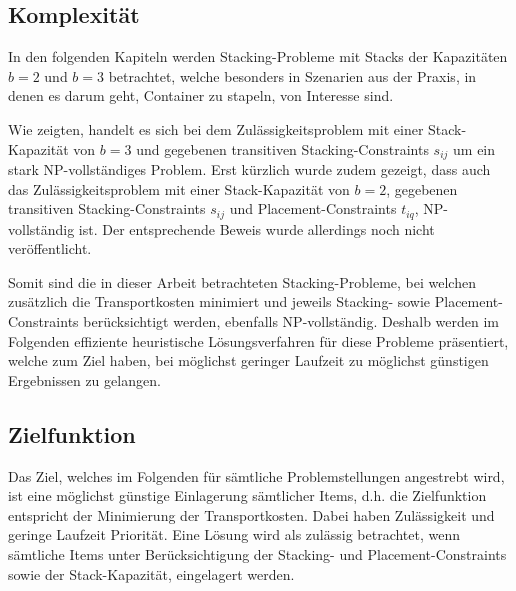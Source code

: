 \pagebreak

\subsection{Komplexität}
\label{sec:complexity}

In den folgenden Kapiteln werden Stacking-Probleme mit Stacks der Kapazitäten $b = 2$
und $b = 3 $ betrachtet, welche besonders in Szenarien aus der Praxis, in denen es darum geht,
Container zu stapeln, von Interesse sind.

Wie \citet{Bruns2015} zeigten, handelt es sich bei dem Zulässigkeitsproblem mit einer Stack-Kapazität von $b=3$ und gegebenen transitiven Stacking-Constraints $s_{ij}$ um ein stark NP-vollständiges Problem. Erst kürzlich wurde zudem gezeigt, dass auch das Zulässigkeitsproblem mit einer Stack-Kapazität von $b=2$, gegebenen transitiven
Stacking-Constraints $s_{ij}$ und Placement-Constraints $t_{iq}$, NP-vollständig ist. Der entsprechende Beweis
wurde allerdings noch nicht veröffentlicht.

Somit sind die in dieser Arbeit betrachteten Stacking-Probleme, bei welchen zusätzlich die Transportkosten minimiert
und jeweils Stacking- sowie Placement-Constraints berücksichtigt werden, ebenfalls NP-vollständig.
Deshalb werden im Folgenden effiziente heuristische Lösungsverfahren für diese Probleme präsentiert,
welche zum Ziel haben, bei möglichst geringer Laufzeit zu möglichst günstigen Ergebnissen zu gelangen.

\subsection{Zielfunktion}
\label{sec:objective}

Das Ziel, welches im Folgenden für sämtliche Problemstellungen angestrebt wird, ist eine möglichst günstige
Einlagerung sämtlicher Items, d.h. die Zielfunktion entspricht der Minimierung der Transportkosten.
Dabei haben Zulässigkeit und geringe Laufzeit Priorität. Eine Lösung wird als zulässig betrachtet,
wenn sämtliche Items unter Berücksichtigung der Stacking- und Placement-Constraints sowie der Stack-Kapazität, eingelagert werden.

